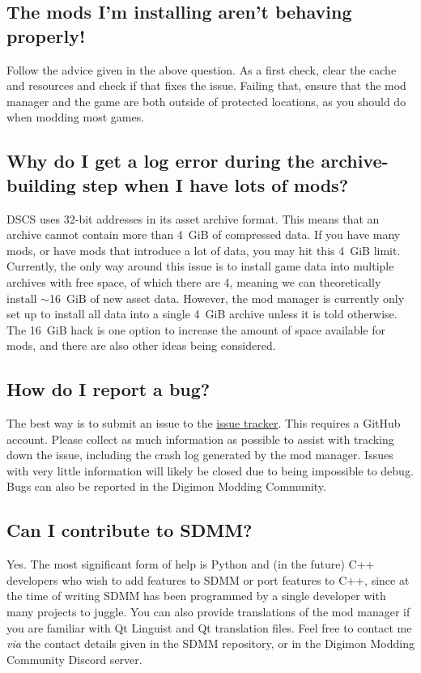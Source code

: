 \documentclass{article}
\begin{document}
\subsection{The mods I'm installing aren't behaving properly!}
Follow the advice given in the above question. As a first check, clear the cache and resources and check if that fixes the issue. Failing that, ensure that the mod manager and the game are both outside of protected locations, as you should do when modding most games.
\subsection{Why do I get a log error during the archive-building step when I have lots of mods?}
DSCS uses 32-bit addresses in its asset archive format. This means that an archive cannot contain more than 4~GiB of compressed data. If you have many mods, or have mods that introduce a lot of data, you may hit this 4~GiB limit. Currently, the only way around this issue is to install game data into multiple archives with free space, of which there are 4, meaning we can theoretically install $\sim$16~GiB of new asset data. However, the mod manager is currently only set up to install all data into a single 4~GiB archive unless it is told otherwise. The 16~GiB hack is one option to increase the amount of space available for mods, and there are also other ideas being considered.

\subsection{How do I report a bug?}
The best way is to submit an issue to the \href{https://github.com/Pherakki/SimpleDSCSModManager/issues?q=is\%3Aopen+is\%3Aissue}{issue tracker}. This requires a GitHub account. Please collect as much information as possible to assist with tracking down the issue, including the crash log generated by the mod manager. Issues with very little information will likely be closed due to being impossible to debug. Bugs can also be reported in the Digimon Modding Community.
 
\subsection{Can I contribute to SDMM?}
Yes. The most significant form of help is Python and (in the future) C++ developers who wish to add features to SDMM or port features to C++, since at the time of writing SDMM has been programmed by a single developer with many projects to juggle. You can also provide translations of the mod manager if you are familiar with Qt Linguist and Qt translation files. Feel free to contact me \textit{via} the contact details given in the SDMM repository, or in the Digimon Modding Community Discord server.
\end{document}
